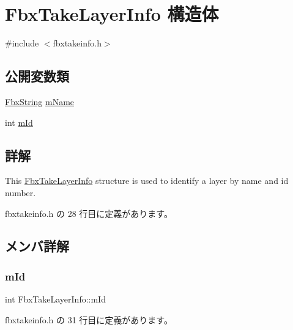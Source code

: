 \hypertarget{struct_fbx_take_layer_info}{}\section{Fbx\+Take\+Layer\+Info 構造体}
\label{struct_fbx_take_layer_info}


{\ttfamily \#include $<$fbxtakeinfo.\+h$>$}

\subsection*{公開変数類}
\begin{DoxyCompactItemize}
\item 
\hyperlink{class_fbx_string}{Fbx\+String} \hyperlink{struct_fbx_take_layer_info_ab011b0f1687904124235aeab266fb769}{m\+Name}
\item 
int \hyperlink{struct_fbx_take_layer_info_ab4c39cd8342a60caa1fb33686f5ac98c}{m\+Id}
\end{DoxyCompactItemize}


\subsection{詳解}
This \hyperlink{struct_fbx_take_layer_info}{Fbx\+Take\+Layer\+Info} structure is used to identify a layer by name and id number. 

 fbxtakeinfo.\+h の 28 行目に定義があります。



\subsection{メンバ詳解}
\mbox{\label{struct_fbx_take_layer_info_ab4c39cd8342a60caa1fb33686f5ac98c}} 
\subsubsection{\texorpdfstring{m\+Id}{mId}}
{\footnotesize\ttfamily int Fbx\+Take\+Layer\+Info\+::m\+Id}



 fbxtakeinfo.\+h の 31 行目に定義があります。

\mbox{\label{struct_fbx_take_layer_info_ab011b0f1687904124235aeab266fb769}} 
